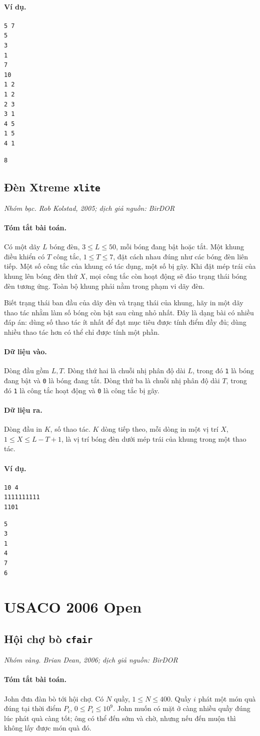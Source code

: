 \documentclass[11pt]{article}
\newcommand{\problem}[4]{%
  \subsection[#1 (#2)]{#1 \hfill {\normalsize\texttt{#2}}}%
  \noindent\textit{#3. #4}\par\smallskip
}
\newcommand{\iosec}[1]{\paragraph{#1}}
\begin{document}
\iosec{Ví dụ.}
\begin{verbatim}
5 7
5
3
1
7
10
1 2
1 2
2 3
3 1
4 5
1 5
4 1
\end{verbatim}

\begin{verbatim}
8
\end{verbatim}

\problem{Đèn Xtreme}{xlite}{Nhóm bạc}{Rob Kolstad, 2005; dịch giả nguồn: BirDOR}

\iosec{Tóm tắt bài toán.}
Có một dãy \(L\) bóng đèn, \(3\le L\le 50\), mỗi bóng đang bật hoặc tắt. Một
khung điều khiển có \(T\) công tắc, \(1\le T\le 7\), đặt cách nhau đúng như
các bóng đèn liên tiếp. Một số công tắc của khung có tác dụng, một số bị gãy.
Khi đặt mép trái của khung lên bóng đèn thứ \(X\), mọi công tắc còn hoạt động
sẽ đảo trạng thái bóng đèn tương ứng. Toàn bộ khung phải nằm trong phạm vi dãy
đèn.

Biết trạng thái ban đầu của dãy đèn và trạng thái của khung, hãy in một dãy
thao tác nhằm làm số bóng còn bật sau cùng nhỏ nhất. Đây là dạng bài có nhiều
đáp án: dùng số thao tác ít nhất để đạt mục tiêu được tính điểm đầy đủ; dùng
nhiều thao tác hơn có thể chỉ được tính một phần.

\iosec{Dữ liệu vào.}
Dòng đầu gồm \(L,T\). Dòng thứ hai là chuỗi nhị phân độ dài \(L\), trong đó
\texttt{1} là bóng đang bật và \texttt{0} là bóng đang tắt. Dòng thứ ba là
chuỗi nhị phân độ dài \(T\), trong đó \texttt{1} là công tắc hoạt động và
\texttt{0} là công tắc bị gãy.

\iosec{Dữ liệu ra.}
Dòng đầu in \(K\), số thao tác. \(K\) dòng tiếp theo, mỗi dòng in một vị trí
\(X\), \(1\le X\le L-T+1\), là vị trí bóng đèn dưới mép trái của khung trong
một thao tác.

\iosec{Ví dụ.}
\begin{verbatim}
10 4
1111111111
1101
\end{verbatim}

\begin{verbatim}
5
3
1
4
7
6
\end{verbatim}

\section{USACO 2006 Open}

\problem{Hội chợ bò}{cfair}{Nhóm vàng}{Brian Dean, 2006; dịch giả nguồn: BirDOR}

\iosec{Tóm tắt bài toán.}
John đưa đàn bò tới hội chợ. Có \(N\) quầy, \(1\le N\le 400\). Quầy \(i\)
phát một món quà đúng tại thời điểm \(P_i\), \(0\le P_i\le 10^9\). John muốn
có mặt ở càng nhiều quầy đúng lúc phát quà càng tốt; ông có thể đến sớm và
chờ, nhưng nếu đến muộn thì không lấy được món quà đó.
\end{document}
